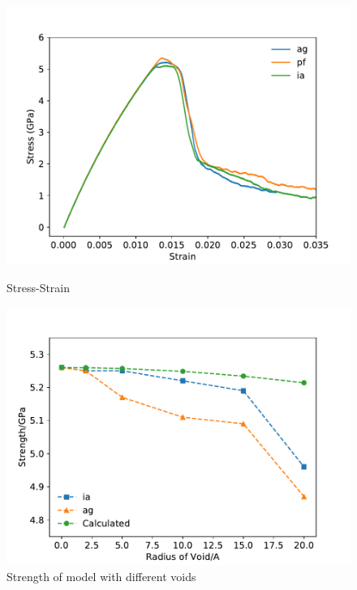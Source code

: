 \documentclass[times,12pt]{elsarticle}
\begin{document}
\begin{figure}[h]
	\centering
	\begin{minipage}{0.495\textwidth}
		\includegraphics[width=1\linewidth]{img/allline}
		\centering
		\caption{Stress-Strain}
		\label{fig:stress&strain}
	\end{minipage}
	\hfill
	\begin{minipage}{0.495\textwidth}		
		\includegraphics[width=1\linewidth]{img/effect_of_vol}
		\centering
		\caption{Strength of model with different voids}
		\label{fig:strength}

	\end{minipage}

\end{figure}
\end{document}
